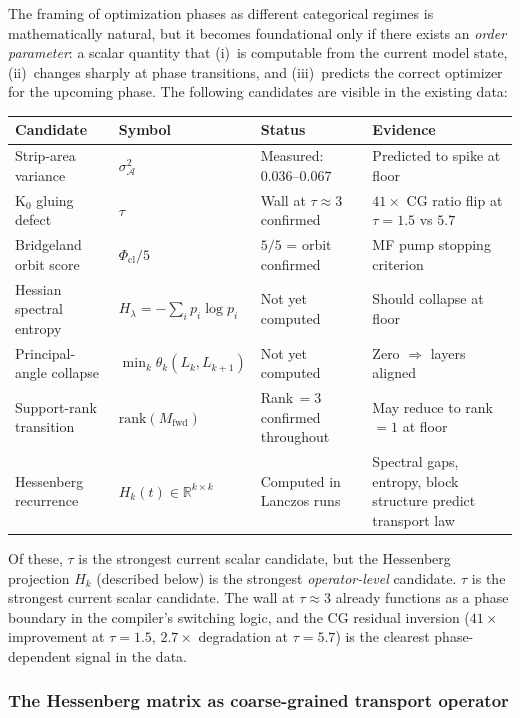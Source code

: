\documentclass[11pt]{amsart}
\begin{document}
The framing of optimization phases as different categorical regimes
is mathematically natural, but it becomes foundational only if there
exists an \emph{order parameter}: a scalar quantity that (i)~is
computable from the current model state, (ii)~changes sharply at
phase transitions, and (iii)~predicts the correct optimizer for the
upcoming phase.
The following candidates are visible in the existing data:

\begin{center}
\footnotesize
\begin{tabular}{@{}llp{2.6cm}p{4.2cm}@{}}
\toprule
Candidate & Symbol & Status & Evidence \\
\midrule
Strip-area variance & $\sigma^2_{\mathcal{A}}$ &
  Measured: $0.036$--$0.067$ &
  Predicted to spike at floor \\
K$_0$ gluing defect & $\tau$ &
  Wall at $\tau \approx 3$ confirmed &
  $41\times$ CG ratio flip at $\tau=1.5$ vs $5.7$ \\
Bridgeland orbit score & $\Phi_\mathrm{cl}/5$ &
  $5/5$ = orbit confirmed &
  MF pump stopping criterion \\
Hessian spectral entropy & $H_\lambda = -\sum_i p_i \log p_i$ &
  Not yet computed &
  Should collapse at floor \\
Principal-angle collapse & $\min_k \theta_k(L_k,L_{k+1})$ &
  Not yet computed &
  Zero $\Rightarrow$ layers aligned \\
Support-rank transition & $\mathrm{rank}(M_\mathrm{fwd})$ &
  Rank\,$=3$ confirmed throughout &
  May reduce to rank\,$=1$ at floor \\
Hessenberg recurrence & $H_k(t) \in \mathbb{R}^{k\times k}$ &
  Computed in Lanczos runs &
  Spectral gaps, entropy, block structure
  predict transport law \\
\bottomrule
\end{tabular}
\end{center}

Of these, $\tau$ is the strongest current scalar candidate,
but the Hessenberg projection $H_k$ (described below)
is the strongest \emph{operator-level} candidate.
$\tau$ is the strongest current scalar candidate.
The wall at $\tau \approx 3$ already functions as a phase boundary
in the compiler's switching logic, and the CG residual inversion
($41\times$ improvement at $\tau=1.5$, $2.7\times$ degradation at
$\tau=5.7$) is the clearest phase-dependent signal in the data.

\subsubsection*{The Hessenberg matrix as coarse-grained transport operator}
\label{sec:hessenberg_invariant}
\end{document}
